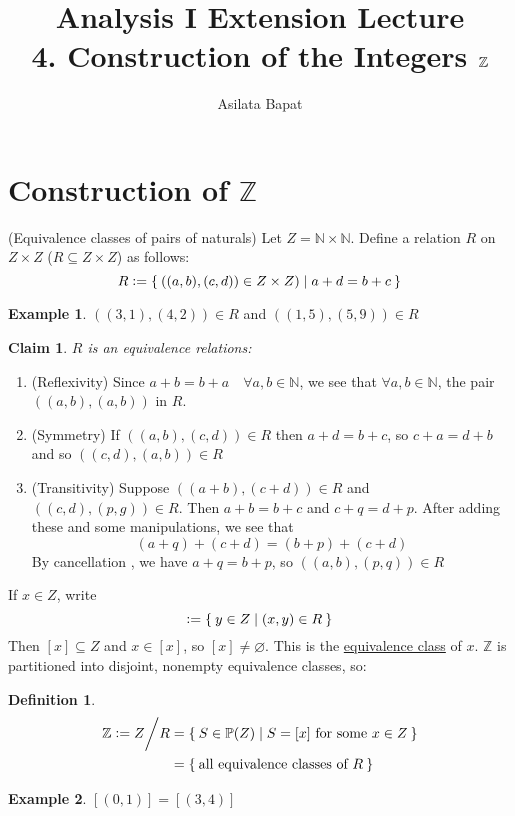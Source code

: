 \documentclass[12pt]{amsart}
\title[Construction of the $\bbZ$]
	{Analysis I Extension Lecture\\4. Construction of the Integers $\bbZ$}
\author{Asilata Bapat}
\newcommand{\bbN}{\mathbb{N}}
\newcommand{\bbZ}{\mathbb{Z}}
\newcommand{\bbP}{\mathbb{P}}
\theoremstyle{plain}
\newtheorem*{claim}{Claim}
\theoremstyle{remark}
\theoremstyle{definition}
\newtheorem*{define}{Definition}
\newtheorem*{eg}{Example}
\begin{document}
\maketitle
{}

\section*{Construction of $\bbZ$}
(Equivalence classes of pairs of naturals)
\newline
Let $Z = \bbN\times \bbN$. Define a relation $R$ on $Z \times Z$ ($R \subseteq Z \times Z$) as follows:
\begin{equation*}
R \vcentcolon = \Set{ \left( (a,b),(c,d) \right) \in Z \times Z) | a+d = b+c}
\end{equation*}
\begin{eg}
$\left( (3,1),(4,2) \right) \in R$ and $\left( (1,5),(5,9) \right) \in R$

\end{eg}
\begin{claim}
$R$ is an equivalence relations:
\end{claim}
\begin{enumerate}[(1)]
	\item (Reflexivity) 
		Since $a+b = b+a\quad \forall a,b \in \bbN$, we see that $\forall a, b \in \bbN$, the pair $((a,b), (a,b))$ in $R$.
	\item (Symmetry)
		If $((a,b), (c,d))\in R$ then $a+d = b+c$, so $c+a = d+b$ and so $((c,d), (a,b))\in R$
	\item (Transitivity)
		Suppose $((a+b),(c+d))\in R$ and $((c,d),(p,g)) \in R$. Then $a+b = b + c $ and $c + q = d + p$. After adding these and some manipulations, we see that 
		\begin{equation*}
			(a+q) + (c+d) = (b+p) + (c+d)
		\end{equation*}
		By cancellation , we have $a+q = b+ p$, so $((a,b),(p,q)) \in R$
\end{enumerate}
If $x \in Z$, write
\begin{equation*}
	[x] \vcentcolon = \Set{ y \in Z | (x,y) \in R }
\end{equation*}
Then $[x] \subseteq Z$ and $x \in [x]$, so $[x] \neq \varnothing$. This is the \ul{equivalence class} of $x$. $\bbZ$ is partitioned into disjoint, nonempty equivalence classes, so:
\begin{define}
	\begin{equation*}
	\begin{split} 
		\bbZ \vcentcolon = Z \bigg/ R &= \Set{ S \in \bbP(Z)| S = [x] \mbox{ for some } x \in Z}\\
		&=  \Set{\mbox{all equivalence classes of $R$}}
	\end{split}
	\end{equation*}
\end{define}
\begin{eg}
	$[(0,1)] = [(3,4)]$
\end{eg}
\end{document}
